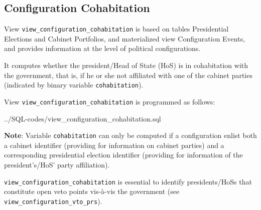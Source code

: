 \subsection{Configuration Cohabitation}\label{view_configuration_cohabitation}
View \texttt{\footnotesize view\_configuration\_cohabitation} is based on tables Presidential Elections and Cabinet Portfolios, and materialized view Configuration Events, and provides information at the level of political configurations.

It computes whether the president/Head of State (HoS) is in cohabitation with the government, that is, if he or she not affiliated with one of the cabinet parties (indicated by binary variable  \texttt{\footnotesize cohabitation}).

View \texttt{\footnotesize view\_configuration\_cohabitation} is programmed as follows:

%
{../SQL-codes/view_configuration_cohabitation.sql}


{\bf Note}: Variable \texttt{\footnotesize cohabitation} can only be computed if a configuration enlist both a cabinet identifier (providing for information on cabinet parties) and a corresponding presidential election identifier (providing for information of the president's/HoS' party affiliation).

\texttt{\footnotesize view\_configuration\_cohabitation} is essential to identify presidents/HoSs that constitute open veto points vis-\`a-vis the government (see \texttt{\footnotesize view\_configuration\_vto\_prs}). 
